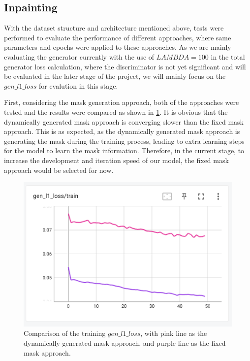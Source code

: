 \documentclass[10pt,twocolumn,letterpaper]{article}
\begin{document}
\subsection{Inpainting}

With the dataset structure and architecture mentioned above, tests were performed to evaluate the performance of different approaches, where same parameters and epochs were applied to these 
approaches. As we are mainly evaluating the generator currently with the use of $LAMBDA = 100$ in the total generator loss calculation, where the discriminator is not yet significant and will be
evaluated in the later stage of the project, we will mainly focus on the $gen\_l1\_loss$ for evalution in this stage. 

First, considering the mask generation approach, both of the approaches were tested and the results were compared as shown in \cref{fig:gen_vs_fix}. It is obvious that the dynamically generated mask 
approach is converging slower than the fixed mask approach. This is as expected, as the dynamically generated mask approach is generating the mask during the training process, leading to extra learning
steps for the model to learn the mask information. Therefore, in the current stage, to increase the development and iteration speed of our model, the fixed mask approach would be selected for now.

\begin{figure}[t]
    \centering
    \includegraphics[width=\linewidth]{figures/milestone/gen_vs_fix.png}
    \caption{Comparison of the training $gen\_l1\_loss$, with pink line as the dynamically generated mask approach, and purple line as the fixed mask approach.}
    \label{fig:gen_vs_fix}
\end{figure}
\end{document}

